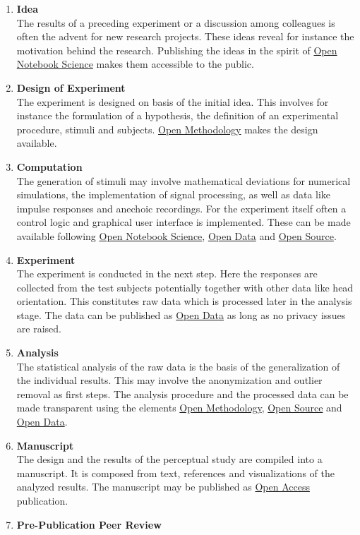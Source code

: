 \documentclass[a4paper, 10pt, twocolumn]{article}
\begin{document}
\begin{enumerate}
\item \textbf{Idea}\\
The results of a preceding experiment or a discussion among colleagues is often the advent 
for new research projects. These ideas reveal for instance the motivation behind the research. 
Publishing the ideas in the spirit of \underline{Open Notebook Science} makes them accessible 
to the public.
%
\item \textbf{Design of Experiment}\\
The experiment is designed on basis of the initial idea. This involves for instance the formulation 
of a hypothesis, the definition of an experimental procedure, stimuli and subjects. \underline{Open Methodology} 
makes the design available.
%
\item\textbf{Computation}\\
The generation of stimuli may involve mathematical deviations for numerical simulations, the 
implementation of signal processing, as well as data like impulse responses and anechoic recordings. For the
experiment itself often a control logic and graphical user interface is implemented. These can be made available 
following \underline{Open Notebook Science}, \underline{Open Data} and \underline{Open Source}.
%
\item \textbf{Experiment}\\
The experiment is conducted in the next step. Here the responses are collected from the test subjects potentially 
together with other data like head orientation. This constitutes raw data which is processed later in the analysis stage. 
The data can be published as \underline{Open Data} as long as no privacy issues are raised.
%
\item \textbf{Analysis}\\
The statistical analysis of the raw data is the basis of the generalization of the individual results. This may
involve the anonymization and outlier removal as first steps. The analysis procedure and the processed data can be made 
transparent using the elements \underline{Open Methodology}, \underline{Open Source} and \underline{Open Data}.
%
\item \textbf{Manuscript}\\
The design and the results of the perceptual study are compiled into a manuscript. It is composed
from text, references and visualizations of the analyzed results. The manuscript may be published 
as \underline{Open Access} publication.
%
\item \textbf{Pre-Publication Peer Review}\\

\end{enumerate}
\end{document}

